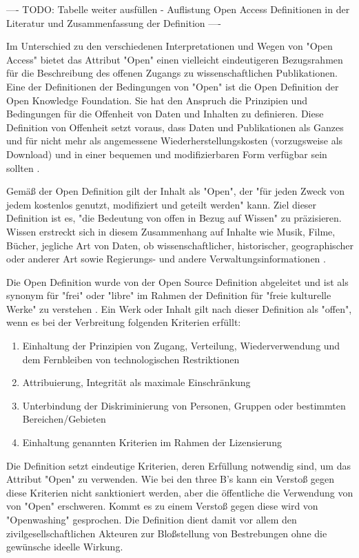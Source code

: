 ---- TODO: Tabelle weiter ausfüllen - Auflistung Open Access Definitionen in der Literatur und Zusammenfassung der Definition ----

Im Unterschied zu den verschiedenen Interpretationen und Wegen von "Open Access" bietet das Attribut "Open" einen vielleicht eindeutigeren Bezugsrahmen für die Beschreibung des offenen Zugangs zu wissenschaftlichen Publikationen. Eine der Definitionen der Bedingungen von "Open" ist die Open Definition der Open Knowledge Foundation. Sie hat den Anspruch die Prinzipien und Bedingungen für die Offenheit von Daten und Inhalten zu definieren. Diese Definition von Offenheit setzt voraus, dass Daten und Publikationen als Ganzes und für nicht mehr als angemessene Wiederherstellungskosten (vorzugsweise als Download) und in einer bequemen und modifizierbaren Form verfügbar sein sollten \cite{Molloy_2011}.

Gemäß der Open Definition gilt der Inhalt als "Open", der "für jeden Zweck von jedem kostenlos genutzt, modifiziert und geteilt werden" \cite{open_definition} kann. Ziel dieser Definition ist es, "die Bedeutung von offen in Bezug auf Wissen" zu präzisieren. Wissen erstreckt sich in diesem Zusammenhang auf Inhalte wie Musik, Filme, Bücher, jegliche Art von Daten, ob wissenschaftlicher, historischer, geographischer oder anderer Art sowie Regierungs- und andere Verwaltungsinformationen \cite{open_definition}.

Die Open Definition wurde von der Open Source Definition abgeleitet und ist als synonym für "frei" oder "libre" im Rahmen der Definition für "freie kulturelle Werke" zu verstehen \cite{suchen}. Ein Werk oder Inhalt gilt nach dieser Definition als "offen", wenn es bei der Verbreitung folgenden Kriterien erfüllt:
\begin{enumerate}
\item Einhaltung der Prinzipien von Zugang, Verteilung, Wiederverwendung und dem Fernbleiben von technologischen Restriktionen
\item Attribuierung, Integrität als maximale Einschränkung
\item Unterbindung der Diskriminierung von Personen, Gruppen oder bestimmten Bereichen/Gebieten
\item Einhaltung genannten Kriterien  im Rahmen der Lizensierung
\end{enumerate}

Die Definition setzt eindeutige Kriterien, deren Erfüllung notwendig sind, um das Attribut "Open" zu verwenden. Wie bei den three B's kann ein Verstoß gegen diese Kriterien nicht sanktioniert werden, aber die öffentliche die Verwendung von von "Open" erschweren. Kommt es zu einem Verstoß gegen diese wird von "Openwashing" gesprochen. Die Definition dient damit vor allem den zivilgesellschaftlichen Akteuren zur Bloßstellung von Bestrebungen ohne die gewünsche ideelle Wirkung.


